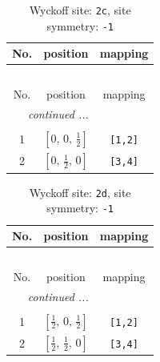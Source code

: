 \documentclass[fleqn,8pt]{jsarticle}
\begin{document}
\begin{longtable}{ccc}
\caption{Wyckoff site: {\tt 2c}, site symmetry: {\tt -1}}
 \\
 \hline \hline
No. & position & mapping \\ \hline \endfirsthead

\multicolumn{2}{l}{\tablename\ \thetable{}} \\
 \hline \hline
No. & position & mapping \\ \hline \endhead

 \hline \hline
\multicolumn{2}{r}{\footnotesize\it continued ...} \\ \endfoot

 \hline \hline
\multicolumn{2}{r}{} \\ \endlastfoot

1 & $\left[ 0,\, 0,\, \frac{1}{2} \right]$ & {\tt [1,2]} \\ \hline
2 & $\left[ 0,\, \frac{1}{2},\, 0 \right]$ & {\tt [3,4]} \\
\end{longtable}
\renewcommand{\arraystretch}{1.2}
\begin{longtable}{ccc}
\caption{Wyckoff site: {\tt 2d}, site symmetry: {\tt -1}}
 \\
 \hline \hline
No. & position & mapping \\ \hline \endfirsthead

\multicolumn{2}{l}{\tablename\ \thetable{}} \\
 \hline \hline
No. & position & mapping \\ \hline \endhead

 \hline \hline
\multicolumn{2}{r}{\footnotesize\it continued ...} \\ \endfoot

 \hline \hline
\multicolumn{2}{r}{} \\ \endlastfoot

1 & $\left[ \frac{1}{2},\, 0,\, \frac{1}{2} \right]$ & {\tt [1,2]} \\ \hline
2 & $\left[ \frac{1}{2},\, \frac{1}{2},\, 0 \right]$ & {\tt [3,4]} \\
\end{longtable}
\renewcommand{\arraystretch}{1.2}
\end{document}
